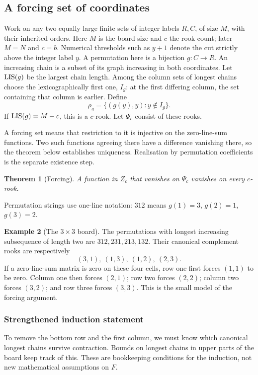\documentclass[11pt,a4paper]{article}
\newtheorem{theorem}{Theorem}[section]
\theoremstyle{definition}\newtheorem{definition}[theorem]{Definition}
\newtheorem{example}[theorem]{Example}
\theoremstyle{remark}\newtheorem{remark}[theorem]{Remark}
\begin{document}
\subsection{A forcing set of coordinates}\label{sec:forcing}
Work on any two equally large finite sets of integer labels $R,C$,
of size $M$, with their inherited orders. Here $M$ is the board size
and $c$ the rook count; later $M=N$ and $c=b$. Numerical thresholds such as
$y+1$ denote the cut strictly above the integer label $y$. A permutation here is a bijection $g:C\to R$. An increasing chain is a subset of its graph increasing in both coordinates. Let $\operatorname{LIS}(g)$ be the largest chain length. Among the column sets of longest chains choose the lexicographically first one, $I_g$: at the first differing column, the set containing that column is earlier. Define
\[\rho_g=\{(g(y),y):y\notin I_g\}.
\]
If $\operatorname{LIS}(g)=M-c$, this is a $c$-rook. Let $\Psi_c$ consist of these rooks.

A forcing set means that restriction to it is injective on the
zero-line-sum functions. Two such functions agreeing there have a
difference vanishing there, so the theorem below establishes uniqueness.
Realisation by permutation coefficients is the separate existence step.

\begin{theorem}[Forcing]\label{thm:force}
A function in $Z_c$ that vanishes on $\Psi_c$ vanishes on every $c$-rook.
\end{theorem}


Permutation strings use one-line notation: $312$ means $g(1)=3$,
$g(2)=1$, $g(3)=2$.
\begin{example}[The $3\times3$ board]
The permutations with longest increasing subsequence of length two are $312,231,213,132$. Their canonical complement rooks are respectively
\[(3,1),\ (1,3),\ (1,2),\ (2,3).
\]
If a zero-line-sum matrix is zero on these four cells, row one first forces $(1,1)$ to be zero. Column one then forces $(2,1)$; row two forces $(2,2)$; column two forces $(3,2)$; and row three forces $(3,3)$. This is the small model of the forcing argument.
\end{example}

\subsubsection{Strengthened induction statement}
To remove the bottom row and the first column, we must know which canonical longest chains survive contraction. Bounds on longest chains in upper parts of the board keep track of this. These are bookkeeping conditions for the induction, not new mathematical assumptions on $F$.
\end{document}
